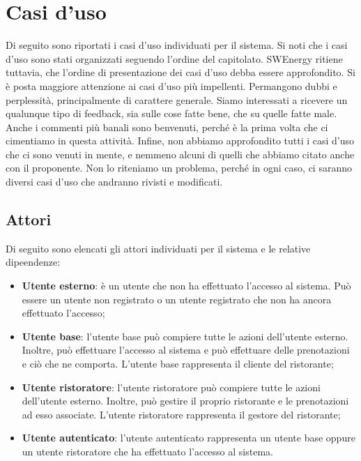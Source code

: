 \section{Casi d'uso}

Di seguito sono riportati i casi d'uso individuati per il sistema. Si noti che i
casi d'uso sono stati organizzati seguendo l'ordine del capitolato. SWEnergy
ritiene tuttavia, che l'ordine di presentazione dei casi d'uso debba essere
approfondito. Si è posta maggiore attenzione ai casi d'uso più impellenti.
Permangono dubbi e perplessità, principalmente di carattere generale. Siamo
interessati a ricevere un qualunque tipo di feedback, sia sulle cose
fatte bene, che su quelle fatte male. Anche i commenti più banali sono
benvenuti, perché è la prima volta che ci cimentiamo in questa attività.
Infine, non abbiamo approfondito tutti i casi d'uso che ci sono venuti in mente,
e nemmeno alcuni di quelli che abbiamo citato anche con il proponente. Non lo
riteniamo un problema, perché in ogni caso, ci saranno diversi casi d'uso che
andranno rivisti e modificati.

\subsection{Attori}

Di seguito sono elencati gli attori individuati per il sistema e le relative
dipeendenze:
\begin{itemize}
	\item \textbf{Utente esterno}: è un utente che non ha effettuato l'accesso al
	      sistema. Può essere un utente non registrato o un utente registrato che non ha
	      ancora effettuato l'accesso;

	\item \textbf{Utente base}: l'utente base può compiere tutte le azioni
	      dell'utente esterno. Inoltre, può effettuare l'accesso al sistema e può
	      effettuare delle prenotazioni e ciò che ne comporta. L'utente base rappresenta
	      il cliente del ristorante;

	\item \textbf{Utente ristoratore}: l'utente ristoratore può compiere tutte le
	      azioni dell'utente esterno. Inoltre, può gestire il proprio ristorante e le
	      prenotazioni ad esso associate. L'utente ristoratore rappresenta il gestore del
	      ristorante;

	\item \textbf{Utente autenticato}: l'utente autenticato rappresenta un utente
	      base oppure un utente ristoratore che ha effettuato l'accesso al sistema.
\end{itemize}
